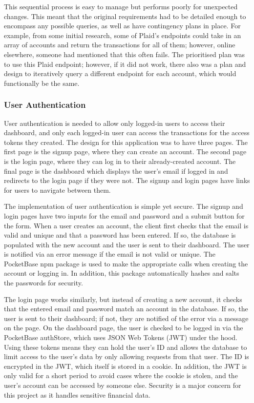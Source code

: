 This sequential process is easy to manage but performs poorly for unexpected changes. This meant that the original requirements had to be detailed enough to encompass any possible queries, as well as have contingency plans in place. For example, from some initial research, some of Plaid's endpoints could take in an array of accounts and return the transactions for all of them; however, online elsewhere, someone had mentioned that this often fails. The prioritised plan was to use this Plaid endpoint; however, if it did not work, there also was a plan and design to iteratively query a different endpoint for each account, which would functionally be the same.

\subsubsection{User Authentication}
User authentication is needed to allow only logged-in users to access their dashboard, and only each logged-in user can access the transactions for the access tokens they created. The design for this application was to have three pages. The first page is the signup page, where they can create an account. The second page is the login page, where they can log in to their already-created account. The final page is the dashboard which displays the user's email if logged in and redirects to the login page if they were not. The signup and login pages have links for users to navigate between them.

The implementation of user authentication is simple yet secure. The signup and login pages have two inputs for the email and password and a submit button for the form. When a user creates an account, the client first checks that the email is valid and unique and that a password has been entered. If so, the database is populated with the new account and the user is sent to their dashboard. The user is notified via an error message if the email is not valid or unique. The PocketBase npm package is used to make the appropriate calls when creating the account or logging in. In addition, this package automatically hashes and salts the passwords for security.

The login page works similarly, but instead of creating a new account, it checks that the entered email and password match an account in the database. If so, the user is sent to their dashboard; if not, they are notified of the error via a message on the page. On the dashboard page, the user is checked to be logged in via the PocketBase authStore, which uses JSON Web Tokens (JWT) under the hood. Using these tokens means they can hold the user's ID and allows the database to limit access to the user's data by only allowing requests from that user. The ID is encrypted in the JWT, which itself is stored in a cookie. In addition, the JWT is only valid for a short period to avoid cases where the cookie is stolen, and the user's account can be accessed by someone else. Security is a major concern for this project as it handles sensitive financial data.

